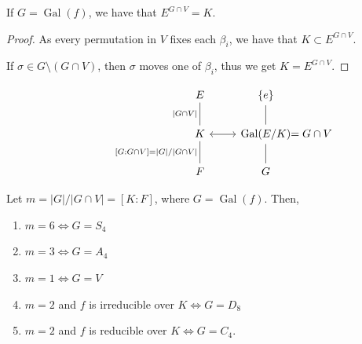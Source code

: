 \documentclass[twoside]{article}
\DeclareMathOperator\Gal{Gal}
\theoremstyle{remark}
\newcounter{theorem}
\begin{document}
\begin{lemma}
  If \(G = \Gal(f)\), we have that \(E^{G \cap V} = K\).
\end{lemma}

\begin{proof}
  As every permutation in \(V\) fixes each \(\beta_i\), we have that \(K \subset E^{G \cap V}\). \par
  If \(\sigma \in G \setminus (G \cap V)\), then \(\sigma\) moves one of \(\beta_i\), thus we get \(K = E^{G \cap V}\).
\end{proof}

\begin{displaymath}
  \begin{tikzcd}
    E \dar[dash,"|G\cap V|"swap] & \{e\} \dar[dash] \\
    K \dar[dash,"{[G:G\cap V]=|G|/|G\cap V|}"swap]\rar[leftrightarrow] & \Gal(E/K)\rlap{\(= G \cap V\)}\dar[dash] \\
    F & G
  \end{tikzcd}
\end{displaymath}

\begin{theorem}
  Let \(m = |G|/|G\cap V| = [K:F]\), where \(G = \Gal(f)\). Then,
  \begin{enumerate}[label=\textup{(\arabic*)},nosep]
    \item \(m=6 \iff G = S_4\)
    \item \(m=3 \iff G = A_4\)
    \item \(m=1 \iff G = V\)
    \item \(m=2\) and \(f\) is irreducible over \(K \iff G = D_8\)
    \item \(m=2\) and \(f\) is reducible over \(K \iff G = C_4\).
  \end{enumerate}
\end{theorem}
\end{document}
